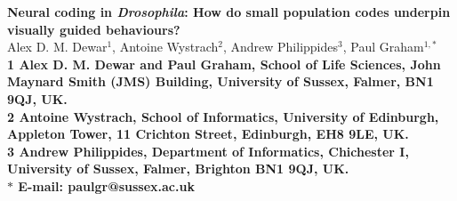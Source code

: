 

\newcommand{\draft}{D6}

\begin{flushleft}
{\Large
\textbf{Neural coding in \emph{Drosophila}: How do small population codes underpin visually guided behaviours?}
}
\\
Alex D. M. Dewar$^{1}$,
Antoine Wystrach$^{2}$,
Andrew Philippides$^{3}$,
Paul Graham$^{1,\ast}$
\\
\bf{1} Alex D. M. Dewar and Paul Graham, School of Life Sciences, John Maynard Smith (JMS) Building, University of Sussex, Falmer, BN1 9QJ, UK.
\\
\bf{2} Antoine Wystrach, School of Informatics, University of Edinburgh, Appleton Tower, 11 Crichton Street, Edinburgh, EH8 9LE, UK.
\\
\bf{3} Andrew Philippides, Department of Informatics, Chichester I, University of Sussex, Falmer, Brighton BN1 9QJ, UK.
\\
$\ast$ E-mail: paulgr@sussex.ac.uk
\end{flushleft}













